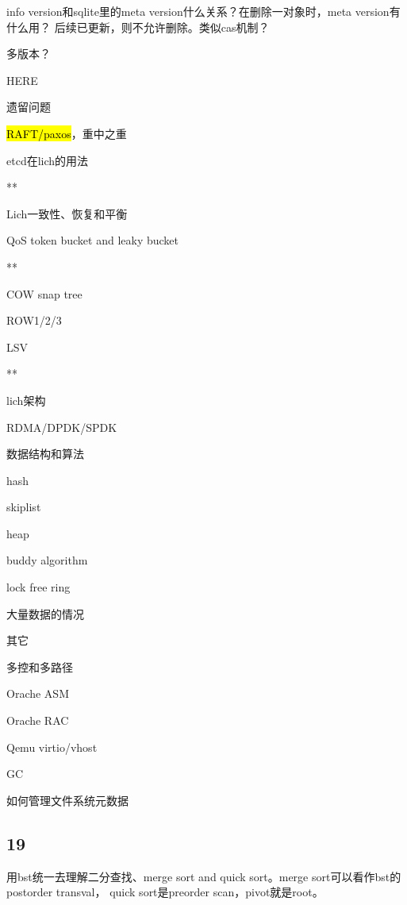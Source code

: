 info version和sqlite里的meta version什么关系？在删除一对象时，meta version有什么用？ 后续已更新，则不允许删除。类似cas机制？

多版本？

\hrulefill

HERE

遗留问题
\begin{enumbox}
\item \hl{RAFT/paxos}，重中之重
\item etcd在lich的用法
\item ***
\item Lich一致性、恢复和平衡
\item QoS token bucket and leaky bucket
\item ***
\item COW snap tree
\item ROW1/2/3
\item LSV
\item ***
\item lich架构
\item RDMA/DPDK/SPDK
\end{enumbox}

数据结构和算法
\begin{enumbox}
\item hash
\item skiplist
\item heap
\item buddy algorithm
\item lock free ring
\item 大量数据的情况
\end{enumbox}

其它
\begin{enumbox}
\item 多控和多路径
\item Orache ASM
\item Orache RAC
\item Qemu virtio/vhost
\item GC
\item 如何管理文件系统元数据
\end{enumbox}

\subsection{19}

用bst统一去理解二分查找、merge sort and quick sort。merge sort可以看作bst的postorder transval，
quick sort是preorder scan，pivot就是root。

